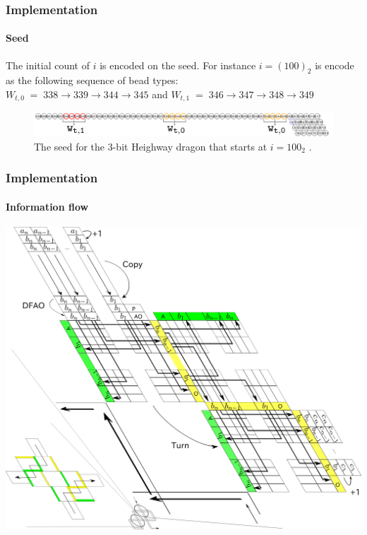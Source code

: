 \documentclass[dvipdfmx,10pt]{beamer}
\begin{document}
\begin{frame}\frametitle{Implementation}\framesubtitle{Seed}
The initial count of $i$ is encoded on the seed. 
For instance $i = (100)_2$ is encode as the following sequence of bead types:\\ 
\vspace*{3mm}
\footnotesize{$W_{t, 0}\;=\; 338\rightarrow 339 \rightarrow 344 \rightarrow 345$ and $W_{t, 1}\;=\; 346\rightarrow 347 \rightarrow 348 \rightarrow 349$}

\vspace*{5mm}
\begin{figure}
\centering
\includegraphics[width=\linewidth]{seed_sample2.png}
\caption{The seed for the 3-bit Heighway dragon that starts at $i = {100}_2$ .}
\end{figure}
\end{frame}

\begin{frame}\frametitle{Implementation}\framesubtitle{Information flow}

\centering
\includegraphics[width=0.6\linewidth]{dragon_vol5.png}

\end{frame}
\end{document}
